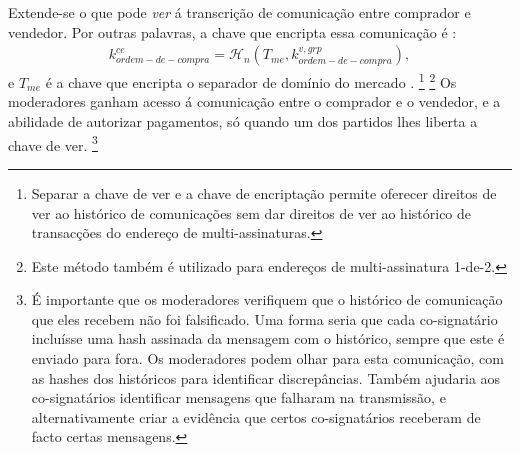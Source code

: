Extende-se o que pode {\em ver} á transcrição de comunicação entre comprador e vendedor. Por outras palavras, a chave que encripta essa comunicação é :
\begin{align*}
k^{ce}_{ordem-de-compra} = \mathcal{H}_n(T_{me},k^{v,grp}_{ordem-de-compra}) ,
\end{align*}
e $T_{me}$ é a chave que encripta o separador de domínio do mercado . 
\footnote{Separar a chave de ver e a chave de encriptação permite oferecer direitos de ver ao histórico de comunicações sem dar direitos de ver ao histórico de transacções do endereço de multi-assinaturas.}   
\footnote{Este método também é utilizado para endereços de multi-assinatura 1-de-2.}
Os moderadores ganham acesso á comunicação entre o comprador e o vendedor, e a abilidade de autorizar pagamentos, só quando um dos partidos lhes liberta a chave de ver. 
\footnote{É importante que os moderadores verifiquem que o histórico de comunicação que eles recebem não foi falsificado. Uma forma seria que cada co-signatário incluísse uma hash assinada da mensagem com o histórico, sempre que este é enviado para fora. Os moderadores podem olhar para esta comunicação, com as hashes dos históricos para identificar discrepâncias. Também ajudaria aos co-signatários identificar mensagens que falharam na transmissão, e alternativamente criar a evidência que certos co-signatários receberam de facto certas mensagens.}    

